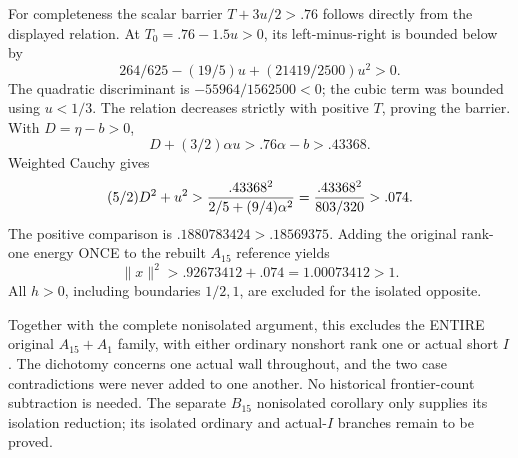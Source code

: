 For completeness the scalar barrier \(T+3u/2>.76\) follows
directly from the displayed relation.
At \(T_0=.76-1.5u>0\), its left-minus-right is bounded below by
\[
                  264/625-(19/5)u+(21419/2500)u^2>0 .
\]
The quadratic discriminant is \(-55964/1562500<0\);
the cubic term was bounded using \(u<1/3\).
The relation decreases strictly with positive \(T\), proving
the barrier.
With \(D=\eta-b>0\),
\[
 D+(3/2)\alpha u>.76\alpha-b>.43368.
\]
Weighted Cauchy gives
\[
 (5/2)D^2+u^2>
 {.43368^2\over2/5+(9/4)\alpha^2}
 ={.43368^2\over803/320}>.074 .
\]
The positive comparison is
\(.1880783424>.18569375\).
Adding the original rank-one energy ONCE to the rebuilt
\(A_{15}\) reference yields
\[
                     \|x\|^2>.92673412+.074=1.00073412>1 .
\]
All \(h>0\), including boundaries \(1/2,1\), are excluded
for the isolated opposite.

Together with the complete nonisolated argument, this excludes
the ENTIRE original \(A_{15}+A_1\) family, with either ordinary
nonshort rank one or actual short \(I\).
The dichotomy concerns one actual wall throughout, and the two
case contradictions were never added to one another.
No historical frontier-count subtraction is needed.
The separate \(B_{15}\) nonisolated corollary only supplies its
isolation reduction; its isolated ordinary and actual-\(I\)
branches remain to be proved.









